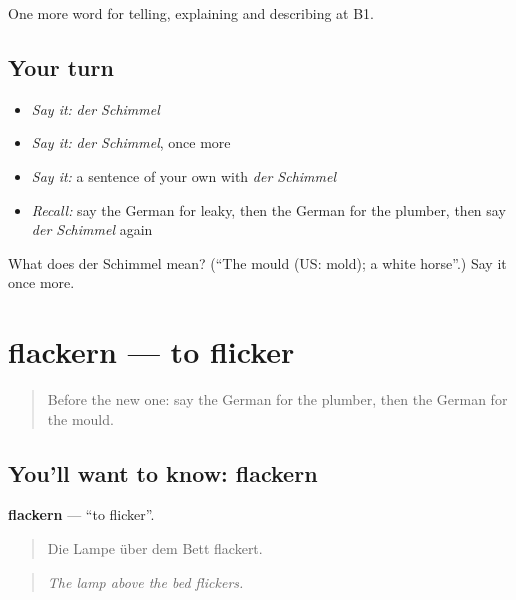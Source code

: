 \begin{grammarlens}[title={What you've built}]
One more word for telling, explaining and describing at B1.
\end{grammarlens}

\subsection*{Your turn}
\begin{itemize}
\raggedright
  \item \emph{Say it:} \emph{der Schimmel}
  \item \emph{Say it:} \emph{der Schimmel}, once more
  \item \emph{Say it:} a sentence of your own with \emph{der Schimmel}
  \item \emph{Recall:} say the German for leaky, then the German for the plumber, then say \emph{der Schimmel} again
\end{itemize}

\begin{tcolorbox}[breakable,colback=teal!4,colframe=teal!35!black,title={Before you move on}]
What does der Schimmel mean? (\textquotedblleft{}The mould (US: mold); a white horse\textquotedblright{}.) Say it once more.
\end{tcolorbox}
\section[flackern]{flackern — to flicker}

\label{lesson:GE-C429-flackern}



\begin{quote}
Before the new one: say the German for the plumber, then the German for the mould.
\end{quote}

\subsection*{You'll want to know: flackern}
\textbf{flackern} — \textquotedblleft{}to flicker\textquotedblright{}.

\begin{quote}
Die Lampe über dem Bett flackert.
\end{quote}

\begin{quote}
\emph{The lamp above the bed flickers.}
\end{quote}

